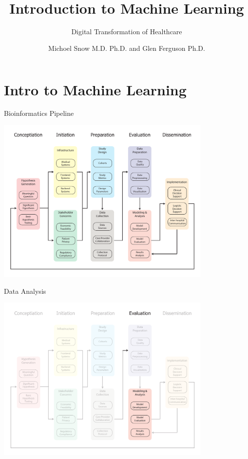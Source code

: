 \documentclass[10pt]{beamer}
\title{Introduction to Machine Learning}
\subtitle{Digital Transformation of Healthcare}
\date{}
\author{Michoel Snow M.D. Ph.D. and Glen Ferguson Ph.D.}
\institute{Center for Health Data Innovations}
\begin{document}
\maketitle

\section{Intro to Machine Learning}

\begin{frame}{Bioinformatics Pipeline}
	\begin{center}
		\includegraphics[width=0.8\textwidth]{images/informatics_pipeline.pdf}	
	\end{center}
\end{frame}


\begin{frame}{Data Analysis}
	\begin{center}
		\includegraphics[width=0.8\textwidth]{images/informatics_pipeline_modeling.pdf}
	\end{center}
\end{frame}
\end{document}

